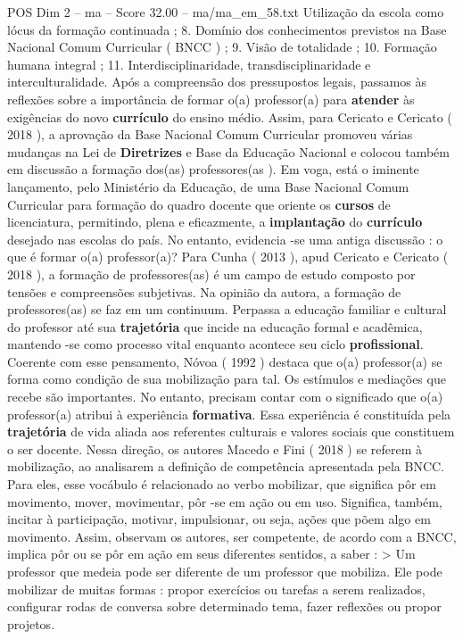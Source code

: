 \begin{textsample}{POS Dim 2 – ma – Score 32.00 – ma/ma\_em\_58.txt}
Utilização da escola como lócus da formação continuada ; 8.
Domínio dos conhecimentos previstos na Base Nacional Comum Curricular ( BNCC ) ; 9.
Visão de totalidade ; 10.
Formação humana integral ; 11.
Interdisciplinaridade, transdisciplinaridade e interculturalidade.
Após a compreensão dos pressupostos legais, passamos às reflexões sobre a importância de formar o(a) professor(a) para \textbf{atender} às exigências do novo \textbf{currículo} do ensino médio.
Assim, para Cericato e Cericato ( 2018 ), a aprovação da Base Nacional Comum Curricular promoveu várias mudanças na Lei de \textbf{Diretrizes} e Base da Educação Nacional e colocou também em discussão a formação dos(as) professores(as ).
Em voga, está o iminente lançamento, pelo Ministério da Educação, de uma Base Nacional Comum Curricular para formação do quadro docente que oriente os \textbf{cursos} de licenciatura, permitindo, plena e eficazmente, a \textbf{implantação} do \textbf{currículo} desejado nas escolas do país.
No entanto, evidencia -se uma antiga discussão : o que é formar o(a) professor(a)?
Para Cunha ( 2013 ), apud Cericato e Cericato ( 2018 ), a formação de professores(as) é um campo de estudo composto por tensões e compreensões subjetivas.
Na opinião da autora, a formação de professores(as) se faz em um continuum.
Perpassa a educação familiar e cultural do professor até sua \textbf{trajetória} que incide na educação formal e acadêmica, mantendo -se como processo vital enquanto acontece seu ciclo \textbf{profissional}.
Coerente com esse pensamento, Nóvoa ( 1992 ) destaca que o(a) professor(a) se forma como condição de sua mobilização para tal.
Os estímulos e mediações que recebe são importantes.
No entanto, precisam contar com o significado que o(a) professor(a) atribui à experiência \textbf{formativa}.
Essa experiência é constituída pela \textbf{trajetória} de vida aliada aos referentes culturais e valores sociais que constituem o ser docente.
Nessa direção, os autores Macedo e Fini ( 2018 ) se referem à mobilização, ao analisarem a definição de competência apresentada pela BNCC.
Para eles, esse vocábulo é relacionado ao verbo mobilizar, que significa pôr em movimento, mover, movimentar, pôr -se em ação ou em uso.
Significa, também, incitar à participação, motivar, impulsionar, ou seja, ações que põem algo em movimento.
Assim, observam os autores, ser competente, de acordo com a BNCC, implica pôr ou se pôr em ação em seus diferentes sentidos, a saber : > Um professor que medeia pode ser diferente de um professor que mobiliza.
Ele pode mobilizar de muitas formas : propor exercícios ou tarefas a serem realizados, configurar rodas de conversa sobre determinado tema, fazer reflexões ou propor projetos.

\end{textsample}
